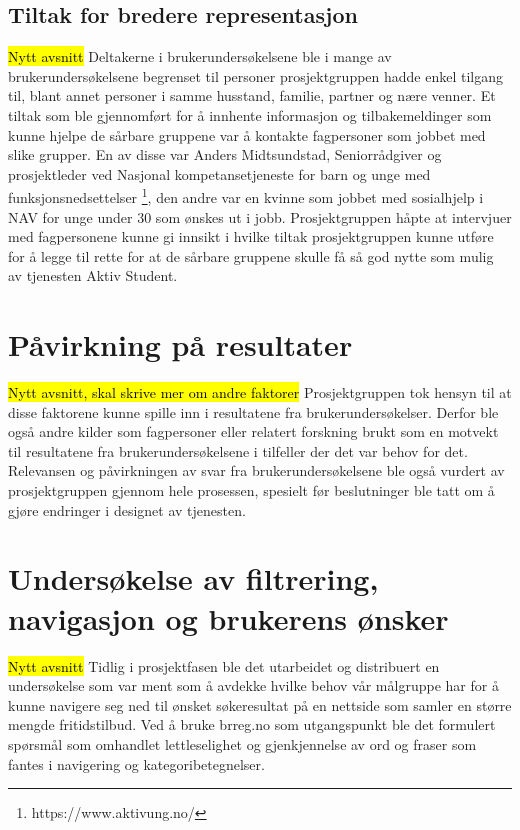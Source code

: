 \subsection{Tiltak for bredere representasjon}
\hl{Nytt avsnitt}
Deltakerne i brukerundersøkelsene ble i mange av brukerundersøkelsene begrenset til personer prosjektgruppen hadde enkel tilgang til, blant annet personer i samme husstand, familie, partner og nære venner. Et tiltak som ble gjennomført for å innhente informasjon og tilbakemeldinger som kunne hjelpe de sårbare gruppene var å kontakte fagpersoner som jobbet med slike grupper. En av disse var Anders Midtsundstad, Seniorrådgiver og prosjektleder ved Nasjonal kompetansetjeneste for barn og unge med funksjonsnedsettelser \footnote{https://www.aktivung.no/}, den andre var en kvinne som jobbet med sosialhjelp i NAV for unge under 30 som ønskes ut i jobb. Prosjektgruppen håpte at intervjuer med fagpersonene kunne gi innsikt i hvilke tiltak prosjektgruppen kunne utføre for å legge til rette for at de sårbare gruppene skulle få så god nytte som mulig av tjenesten Aktiv Student.

\section{Påvirkning på resultater}
\hl{Nytt avsnitt, skal skrive mer om andre faktorer}
Prosjektgruppen tok hensyn til at disse faktorene kunne spille inn i resultatene fra brukerundersøkelser. Derfor ble også andre kilder som fagpersoner eller relatert forskning brukt som en motvekt til resultatene fra brukerundersøkelsene i tilfeller der det var behov for det. Relevansen og påvirkningen av svar fra brukerundersøkelsene ble også vurdert av prosjektgruppen gjennom hele prosessen, spesielt før beslutninger ble tatt om å gjøre endringer i designet av tjenesten. 

\section{Undersøkelse av filtrering, navigasjon og brukerens ønsker}
\label{section:google-forms-test}
\hl{Nytt avsnitt}
Tidlig i prosjektfasen ble det utarbeidet og distribuert en undersøkelse som var ment som å avdekke hvilke behov vår målgruppe har for å kunne navigere seg ned til ønsket søkeresultat på en nettside som samler en større mengde fritidstilbud.
Ved å bruke brreg.no som utgangspunkt ble det formulert spørsmål som omhandlet lettleselighet og gjenkjennelse av ord og fraser som fantes i navigering og kategoribetegnelser.

